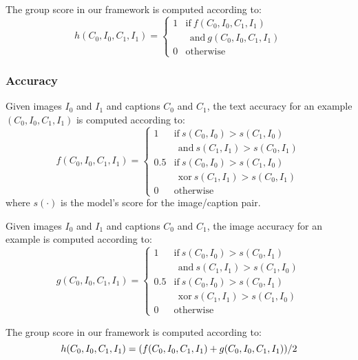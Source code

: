 The group score in our framework is computed according to:
\begin{equation}\label{eq:group-score}
        h(C_{0},I_{0},C_{1},I_{1})= 
    \begin{cases}
        1 & \text{if}\  f(C_{0},I_{0},C_{1},I_{1})  \\
         & \ \ \text{and}\ g(C_{0},I_{0},C_{1},I_{1})\\
        0              & \text{otherwise}
    \end{cases}
\end{equation}

\subsubsection{Accuracy}

Given images $I_0$ and $I_{1}$ and captions $C_{0}$ and $C_{1}$, the text accuracy for an example $(C_{0},I_{0},C_{1},I_{1})$ is computed according to:
\begin{equation}\label{eq:text-accuracy}
        f(C_{0},I_{0},C_{1},I_{1})= 
    \begin{cases}
        1 & \text{if}\  s(C_{0}, I_{0}) > s(C_{1}, I_{0}) \\
        & \ \ \text{and}\ s(C_{1}, I_{1}) > s(C_{0}, I_{1}) \\
        0.5 & \text{if}\  s(C_{0}, I_{0}) > s(C_{1}, I_{0}) \\
        & \ \ \text{xor}\ s(C_{1}, I_{1}) > s(C_{0}, I_{1}) \\
        0              & \text{otherwise}
    \end{cases}
\end{equation}
where $s(\cdot)$ is the model's score for the image/caption pair.

Given images $I_0$ and $I_{1}$ and captions $C_{0}$ and $C_{1}$, the image accuracy for an example is computed according to:
\begin{equation}\label{eq:image-accuracy}
        g(C_{0},I_{0},C_{1},I_{1})= 
    \begin{cases}
        1 & \text{if}\  s(C_{0}, I_{0}) > s(C_{0}, I_{1})\\
        & \ \ \text{and}\ s(C_{1}, I_{1}) > s(C_{1}, I_{0}) \\
        0.5 & \text{if}\  s(C_{0}, I_{0}) > s(C_{0}, I_{1})\\
        & \ \ \text{xor}\ s(C_{1}, I_{1}) > s(C_{1}, I_{0}) \\
        0              & \text{otherwise}
    \end{cases}
\end{equation}

The group score in our framework is computed according to:
\begin{equation}\label{eq:group-accuracy}
        h(C_{0},I_{0},C_{1},I_{1})= 
        (f(C_{0},I_{0},C_{1},I_{1}) + g(C_{0},I_{0},C_{1},I_{1})) / 2\\
\end{equation}
